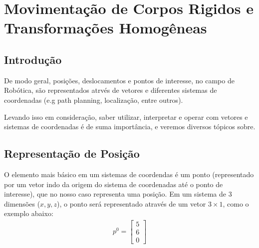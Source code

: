 \documentclass{article}
\begin{document}
    \newpage
    \section{Movimentação de Corpos Rigidos e Transformações Homogêneas}
        \subsection{Introdução}
            De modo geral, posições, deslocamentos e pontos de interesse, no campo de Robótica, são representados atrvés de vetores e diferentes sistemas de coordenadas (e.g path planning, localização, entre outros).

            Levando isso em consideração, saber utilizar, interpretar e operar com vetores e sistemas de coordenadas é de suma importância, e veremos diversos tópicos sobre.

        \subsection{Representação de Posição}
            O elemento mais básico em um sistemas de coordendas é um ponto (representado por um vetor indo da origem do sistema de coordenadas até o ponto de interesse), que no nosso caso representa uma posição. Em um sistema de 3 dimensões ($x, y, z$), o ponto será representado através de um vetor $3\times 1$, como o exemplo abaixo:
            \begin{align}
                p^0 = \begin{bmatrix}
                    5 \\ 
                    6 \\
                    0
                \end{bmatrix}
            \end{align}
\end{document}
